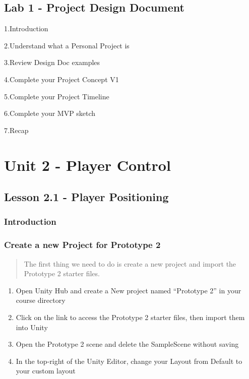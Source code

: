 \documentclass[
]{book}
\providecommand{\tightlist}{%
  \setlength{\itemsep}{0pt}\setlength{\parskip}{0pt}}
\begin{document}
\hypertarget{lab-1---project-design-document}{%
\subsection{Lab 1 - Project Design Document}\label{lab-1---project-design-document}}

1.Introduction

2.Understand what a Personal Project is

3.Review Design Doc examples

4.Complete your Project Concept V1

5.Complete your Project Timeline

6.Complete your MVP sketch

7.Recap

\hypertarget{unit-2---player-control}{%
\section{Unit 2 - Player Control}\label{unit-2---player-control}}

\hypertarget{lesson-2.1---player-positioning}{%
\subsection{Lesson 2.1 - Player Positioning}\label{lesson-2.1---player-positioning}}

\hypertarget{introduction}{%
\subsubsection{Introduction}\label{introduction}}

\hypertarget{create-a-new-project-for-prototype-2}{%
\subsubsection{Create a new Project for Prototype 2}\label{create-a-new-project-for-prototype-2}}

\begin{quote}
The first thing we need to do is create a new project and import the Prototype 2 starter files.
\end{quote}

\begin{enumerate}
\def\labelenumi{\arabic{enumi}.}
\tightlist
\item
  Open Unity Hub and create a New project named ``Prototype 2'' in your course directory
\item
  Click on the link to access the Prototype 2 starter files, then import them into Unity
\item
  Open the Prototype 2 scene and delete the SampleScene without saving
\item
  In the top-right of the Unity Editor, change your Layout from Default to your custom layout
\end{enumerate}
\end{document}
